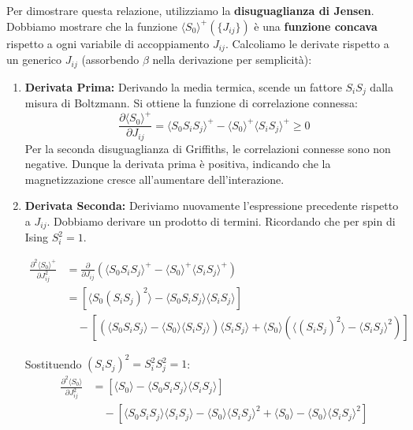 \noindent Per dimostrare questa relazione, utilizziamo la \textbf{disuguaglianza di Jensen}. Dobbiamo mostrare che la funzione $\langle S_0 \rangle^+(\{J_{ij}\})$ è una \textbf{funzione concava} rispetto a ogni variabile di accoppiamento $J_{ij}$. Calcoliamo le derivate rispetto a un generico $J_{ij}$ (assorbendo $\beta$ nella derivazione per semplicità):

\begin{enumerate}
    \item \textbf{Derivata Prima:}
    Derivando la media termica, scende un fattore $S_i S_j$ dalla misura di Boltzmann. Si ottiene la funzione di correlazione connessa:
    \begin{equation}
    \frac{\partial \langle S_0 \rangle^+}{\partial J_{ij}} = \langle S_0 S_i S_j \rangle^+ - \langle S_0 \rangle^+ \langle S_i S_j \rangle^+ \ge 0
    \end{equation} 
    Per la seconda disuguaglianza di Griffiths, le correlazioni connesse sono non negative. Dunque la derivata prima è positiva, indicando che la magnetizzazione cresce all'aumentare dell'interazione.

    \item \textbf{Derivata Seconda:}
    Deriviamo nuovamente l'espressione precedente rispetto a $J_{ij}$. Dobbiamo derivare un prodotto di termini. Ricordando che per spin di Ising $S_i^2 = 1$.
    
    \begin{equation}
    \begin{split}
    \frac{\partial^2 \langle S_0 \rangle^+}{\partial J_{ij}^2} &= \frac{\partial}{\partial J_{ij}} \left( \langle S_0 S_i S_j \rangle^+ - \langle S_0 \rangle^+ \langle S_i S_j \rangle^+ \right) \\
    &= \left[ \langle S_0 (S_i S_j)^2 \rangle - \langle S_0 S_i S_j \rangle \langle S_i S_j \rangle \right] \\
    &\quad - \left[ \left( \langle S_0 S_i S_j \rangle - \langle S_0 \rangle \langle S_i S_j \rangle \right) \langle S_i S_j \rangle + \langle S_0 \rangle \left( \langle (S_i S_j)^2 \rangle - \langle S_i S_j \rangle^{2} \right) \right]
    \end{split}
    \end{equation}
    
    Sostituendo $(S_i S_j)^2 = S_i^2 S_j^2 = 1$:
    \begin{equation}
    \begin{split}
    \frac{\partial^2 \langle S_0 \rangle}{\partial J_{ij}^2} &= \left[ \langle S_0 \rangle - \langle S_0 S_i S_j \rangle \langle S_i S_j \rangle \right] \\
    &\quad - \left[ \langle S_0 S_i S_j \rangle \langle S_i S_j \rangle - \langle S_0 \rangle \langle S_i S_j \rangle^{2} + \langle S_0 \rangle - \langle S_0 \rangle \langle S_i S_j \rangle^{2} \right]
    \end{split}
    \end{equation}
    

\end{enumerate}
